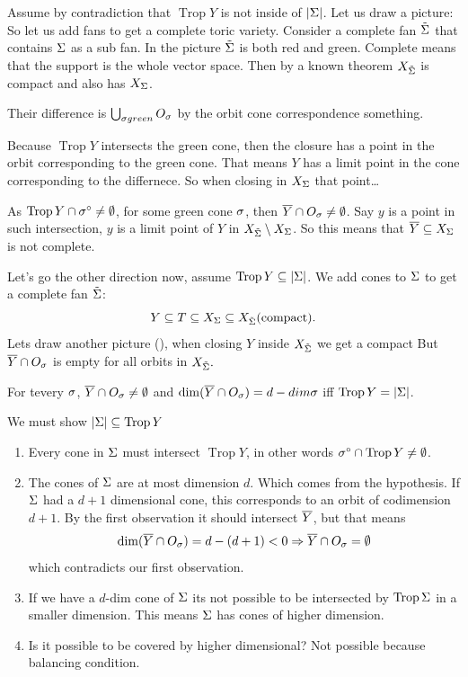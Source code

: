 \documentclass[12pt]{memoir}
\DeclareMathOperator{\Trop}{Trop}
\theoremstyle{definition}
\begin{document}
\begin{ptcbp}
Assume by contradiction that $\Trop Y$ is not inside of $|\Sigma|$. Let us draw a picture: 
So let us add fans to get a complete toric variety. Consider a complete fan $\tilde {\Sigma}$ that contains $\Sigma$ as a sub fan. In the picture $\tilde {\Sigma}$ is both red and green. Complete means that the support is the whole vector space. Then by a known theorem $X_{\tilde{\Sigma}}$ is compact and also has $X_\Sigma$.\par 
Their difference is $\bigcup_{\sigma green}O_\sigma$ by the orbit cone correspondence something.\par 
Because $\Trop Y$ intersects the green cone, then the closure has a point in the orbit corresponding to the green cone. That means $Y$ has a limit point in the cone corresponding to the differnece. So when closing in $X_\Sigma$ that point\dots\par 
As $\Trop Y\cap \sg^\circ\neq\emptyset$, for some green cone $\sigma$, then $\overline Y\cap O_\sigma\neq \emptyset$. Say $y$ is a point in such intersection, $y$ is a limit point of $Y$ in $X_{\tilde{\Sigma}}\setminus X_\Sigma$. So this means that $\overline Y\subseteq X_\Sigma$ is not complete.\par 
Let's go the other direction now, assume $\Trop Y\subseteq |\Sg|$. We add cones to $\Sigma$ to get a complete fan $\tilde {\Sigma}$:
$$Y\subseteq T\subseteq X_\Sigma\subseteq X_{\tilde {\Sigma}} (\text{compact}).$$
Lets draw another picture (), when closing $Y$ inside $X_{\tilde{\Sigma}}$ we get a compact  But $\overline Y\cap O_\sigma$ is empty for all orbits in $X_{\tilde{\Sigma}}.$
\end{ptcbp}
\begin{Th}

\end{Th}

\begin{ptcbp}
For tevery $\sigma$, $\overline Y\cap O_\sigma\neq \emptyset$ and $\dim(\overline Y\cap O_\sigma)=d-dim\sigma$ iff $\Trop Y=|\Sg|$.\par 
We must show $|\Sg|\subseteq\Trop Y$
\begin{enumerate}
    \item Every cone in $\Sigma$ must intersect $\Trop Y$, in other words $\sg^\circ\cap\Trop Y\neq\emptyset$.
    \item The cones of $\Sigma$ are at most dimension $d$. Which comes from the hypothesis. If $\Sigma$ had a $d+1$ dimensional cone, this corresponds to an orbit of codimension $d+1$. By the first observation it should intersect $\overline Y$, but that means 
    $$\dim (\overline Y\cap O_\sigma)=d-(d+1)<0\Rightarrow \overline Y\cap O_\sigma=\emptyset$$
    which contradicts our first observation.
    \item If we have a $d$-dim cone of $\Sigma$ its not possible to be intersected by $\Trop\Sg$ in a smaller dimension. This means $\Sigma$ has cones of higher dimension.
    \item Is it possible to be covered by higher dimensional? Not possible because balancing condition.
\end{enumerate}
\end{ptcbp}
\end{document}
